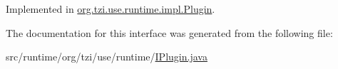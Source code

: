 Implemented in \hyperlink{classorg_1_1tzi_1_1use_1_1runtime_1_1impl_1_1_plugin_a03fa8f2d7213ac7a7f62ba60adf90d62}{org.\-tzi.\-use.\-runtime.\-impl.\-Plugin}.



The documentation for this interface was generated from the following file\-:\begin{DoxyCompactItemize}
\item 
src/runtime/org/tzi/use/runtime/\hyperlink{_i_plugin_8java}{I\-Plugin.\-java}\end{DoxyCompactItemize}
